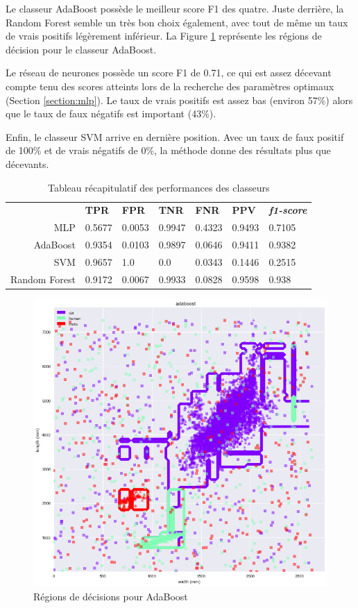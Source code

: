 \documentclass[a4paper]{report}
\begin{document}
Le classeur AdaBoost possède le meilleur score F1 des quatre. Juste derrière, la Random Forest semble un très bon choix également, avec tout de même un taux de vrais positifs légèrement inférieur. La Figure \ref{fig:adaboost_contour} représente les régions de décision pour le classeur AdaBoost.

Le réseau de neurones possède un score F1 de 0.71, ce qui est assez décevant compte tenu des scores atteints lors de la recherche des paramètres optimaux (Section \ref{section:mlp}). Le taux de vrais positifs est assez bas (environ 57\%) alors que le taux de faux négatifs est important (43\%).

Enfin, le classeur SVM arrive en dernière position. Avec un taux de faux positif de 100\% et de vrais négatifs de 0\%, la méthode donne des résultats plus que décevants. 

\begin{table}[h]
\centering
\begin{tabular}{r | llllll}
& \textbf{TPR} & \textbf{FPR} & \textbf{TNR} & \textbf{FNR} & \textbf{PPV} & \textbf{\emph{f1-score}} \\
MLP & 0.5677 & 0.0053 & 0.9947 & 0.4323 & 0.9493 & 0.7105 \\
AdaBoost & 0.9354 & 0.0103 & 0.9897 & 0.0646 & 0.9411 & 0.9382 \\
SVM & 0.9657 & 1.0 & 0.0 & 0.0343 & 0.1446 & 0.2515 \\
Random Forest & 0.9172 & 0.0067 & 0.9933 & 0.0828 & 0.9598 & 0.938 \\
\end{tabular}
\caption{Tableau récapitulatif des performances des classeurs\label{table:scores}}
\end{table}

\begin{figure}
\centering
\includegraphics[width=\textwidth]{img/adaboost_contour.png}
\caption{Régions de décisions pour AdaBoost\label{fig:adaboost_contour}}
\end{figure}
\end{document}
